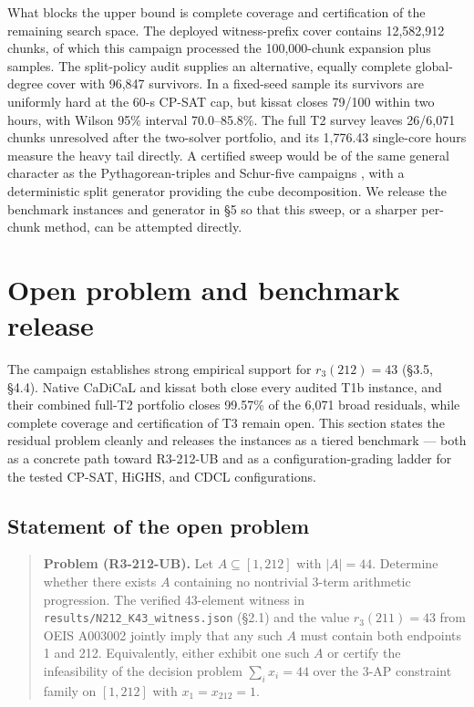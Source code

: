 What blocks the upper bound is complete coverage and certification of the
remaining search space. The deployed witness-prefix cover contains
12,582,912 chunks, of which this campaign processed the 100,000-chunk
expansion plus samples. The split-policy audit supplies an alternative,
equally complete global-degree cover with 96,847 survivors. In a fixed-seed
sample its survivors are uniformly hard at the 60-s CP-SAT cap, but kissat
closes 79/100 within two hours, with Wilson 95\% interval 70.0--85.8\%.
The full T2 survey leaves 26/6,071
chunks unresolved after the two-solver portfolio, and its 1,776.43
single-core hours measure the heavy tail directly. A certified sweep would be
of the same general character as the Pythagorean-triples and Schur-five
campaigns \cite{heule-kullmann-marek-2016,heule-2018-schur}, with a
deterministic split generator providing the cube decomposition. We release the
benchmark instances and generator in §5 so that this sweep, or a sharper
per-chunk method, can be attempted directly.

\section{Open problem and benchmark release}\label{open-problem-and-benchmark-release}

The campaign establishes strong empirical support for $r_3(212) = 43$
(§3.5, §4.4). Native CaDiCaL and kissat both close every audited T1b
instance, and their combined full-T2 portfolio closes 99.57\% of the
6,071 broad residuals, while complete coverage and certification of T3
remain open. This
section states the residual problem cleanly and releases the instances
as a tiered benchmark --- both as a concrete path toward R3-212-UB and as
a configuration-grading ladder for the tested CP-SAT, HiGHS, and CDCL
configurations.

\subsection{Statement of the open problem}\label{statement-of-the-open-problem}

\begin{quote}
\textbf{Problem (R3-212-UB).} Let $A\subseteq[1,212]$ with $|A|=44$. Determine
whether there exists $A$ containing no nontrivial 3-term arithmetic
progression. The verified 43-element witness in
\texttt{results/N212\_K43\_witness.json} (§2.1) and the value $r_3(211) = 43$
from OEIS A003002 jointly imply that any such $A$ must contain both
endpoints 1 and 212. Equivalently, either exhibit one such $A$
or certify the infeasibility of the decision problem
$\sum_i x_i = 44$ over the 3-AP constraint family on $[1, 212]$
with $x_1=x_{212}=1$.
\end{quote}

